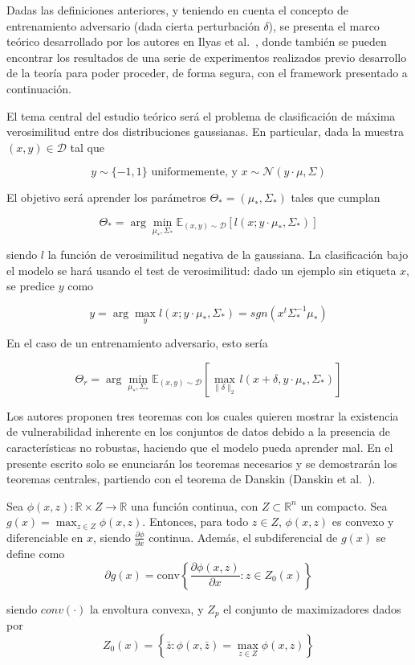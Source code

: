 Dadas las definiciones anteriores, y teniendo en cuenta el concepto de entrenamiento adversario (dada cierta perturbación $\delta$), se presenta el marco teórico desarrollado por los autores en Ilyas et al.~\cite{NoRobustFeatures}, donde también se pueden encontrar los resultados de una serie de experimentos realizados previo desarrollo de la teoría para poder proceder, de forma segura, con el framework presentado a continuación.

El tema central del estudio teórico será el problema de clasificación de máxima verosimilitud entre dos distribuciones gaussianas. En particular, dada la muestra $(x,y) \in \mathcal{D}$ tal que

$$y \sim \{-1,1\} \text{ uniformemente, y } x \sim \mathcal{N}(y \cdot \mu,\Sigma)$$

El objetivo será aprender los parámetros $\Theta_*=(\mu_*,\Sigma_*)$ tales que cumplan

$$\Theta_* = \arg \min_{\mu_*,\Sigma_*} \mathbb{E}_{(x,y)\sim \mathcal{D}} \left[ l(x;y\cdot \mu_*,\Sigma_*) \right]$$

siendo $l$ la función de verosimilitud negativa de la gaussiana. La clasificación bajo el modelo se hará usando el test de verosimilitud: dado un ejemplo sin etiqueta $x$, se predice $y$ como

$$y= \arg \max_{y} l(x;y \cdot \mu_*,\Sigma_*)=sgn(x^{t}\Sigma_*^{-1}\mu_*)$$

En el caso de un entrenamiento adversario, esto sería

$$\Theta_r = \arg \min_{\mu_*,\Sigma_*} \mathbb{E}_{(x,y) \sim \mathcal{D}} \left[ \max_{\|\delta \|_2} l(x+\delta,y \cdot \mu_*,\Sigma_*) \right]$$

Los autores proponen tres teoremas con los cuales quieren mostrar la existencia de vulnerabilidad inherente en los conjuntos de datos debido a la presencia de características no robustas, haciendo que el modelo pueda aprender mal. En el presente escrito solo se enunciarán los teoremas necesarios y se demostrarán los teoremas centrales, partiendo con el teorema de Danskin (Danskin et al.~\cite{DanskinTeoremaMaxMin}).

\begin{teorema} \label{tDanskin}
Sea $\phi(x,z): \mathbb{R} \times Z \to \mathbb{R}$ una función continua, con $Z \subset \mathbb{R}^n$ un compacto. Sea $g(x)=\max_{z \in Z} \phi(x,z)$. Entonces, para todo $z \in Z$, $\phi(x,z)$ es convexo y diferenciable en $x$, siendo $\frac{\partial \phi}{\partial x}$ continua. Además, el subdiferencial de $g(x)$ se define como
\[
\partial g(x) = \text{conv} \left\{ \frac{\partial \phi(x,z)}{\partial x} : z \in Z_0(x) \right\}
\]

siendo $conv(\cdot)$ la envoltura convexa, y $Z_p$ el conjunto de maximizadores dados por
\[
Z_0(x) = \left\{ \bar{z} : \phi(x,\bar{z}) = \max_{z \in Z} \phi(x,z) \right\}
\]

\end{teorema}

